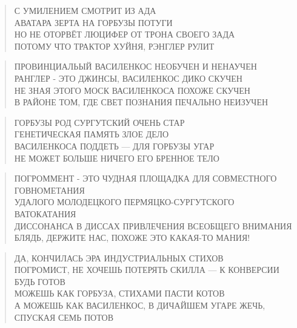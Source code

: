 \poemtitle{***}
\begin{verse}
С УМИЛЕНИЕМ СМОТРИТ ИЗ АДА \\
АВАТАРА ЗЕРТА НА ГОРБУЗЫ ПОТУГИ\\
НО НЕ ОТОРВЁТ ЛЮЦИФЕР ОТ ТРОНА СВОЕГО ЗАДА\\
ПОТОМУ ЧТО ТРАКТОР ХУЙНЯ, РЭНГЛЕР РУЛИТ
\end{verse}

\poemtitle{***}
\begin{verse}
ПРОВИНЦИАЛЬЫЙ ВАСИЛЕНКОС НЕОБУЧЕН И НЕНАУЧЕН\\
РАНГЛЕР - ЭТО ДЖИНСЫ, ВАСИЛЕНКОС ДИКО СКУЧЕН\\
НЕ ЗНАЯ ЭТОГО МОСК ВАСИЛЕНКОСА ПОХОЖЕ СКУЧЕН\\
В РАЙОНЕ ТОМ, ГДЕ СВЕТ ПОЗНАНИЯ ПЕЧАЛЬНО НЕИЗУЧЕН
\end{verse}

\poemtitle{***}
\begin{verse}
ГОРБУЗЫ РОД СУРГУТСКИЙ ОЧЕНЬ СТАР\\
ГЕНЕТИЧЕСКАЯ ПАМЯТЬ ЗЛОЕ ДЕЛО\\
ВАСИЛЕНКОСА ПОДДЕТЬ ­— ДЛЯ ГОРБУЗЫ УГАР\\
НЕ МОЖЕТ БОЛЬШЕ НИЧЕГО ЕГО БРЕННОЕ ТЕЛО
\end{verse}

\poemtitle{***}
\begin{verse}
ПОГРОММЕНТ - ЭТО ЧУДНАЯ ПЛОЩАДКА ДЛЯ СОВМЕСТНОГО ГОВНОМЕТАНИЯ\\
УДАЛОГО МОЛОДЕЦКОГО ПЕРМЯЦКО-СУРГУТСКОГО ВАТОКАТАНИЯ\\
ДИССОНАНСА В ДИССАХ ПРИВЛЕЧЕНИЯ ВСЕОБЩЕГО ВНИМАНИЯ\\
БЛЯДЬ, ДЕРЖИТЕ НАС, ПОХОЖЕ ЭТО КАКАЯ-ТО МАНИЯ!
\end{verse}

\poemtitle{***}
\begin{verse}
ДА, КОНЧИЛАСЬ ЭРА ИНДУСТРИАЛЬНЫХ СТИХОВ\\
ПОГРОМИСТ, НЕ ХОЧЕШЬ ПОТЕРЯТЬ СКИЛЛА — К КОНВЕРСИИ БУДЬ ГОТОВ\\
МОЖЕШЬ КАК ГОРБУЗА, СТИХАМИ ПАСТИ КОТОВ\\
А МОЖЕШЬ КАК ВАСИЛЕНКОС, В ДИЧАЙШЕМ УГАРЕ ЖЕЧЬ, СПУСКАЯ СЕМЬ ПОТОВ
\end{verse}

